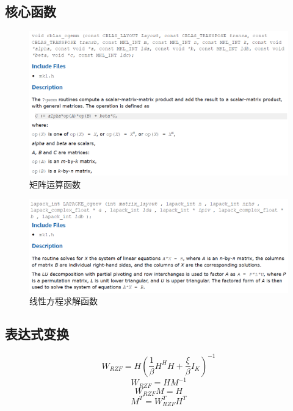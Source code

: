 \documentclass{article}
\begin{document}
\subsection{核心函数}
\begin{figure}[H]
	\centering
	\includegraphics[width = \textwidth]{gemm.png}
	\caption{矩阵运算函数}
\end{figure}
\begin{figure}[H]
	\centering
	\includegraphics[width = \textwidth]{gesv.png}
	\caption{线性方程求解函数}
\end{figure}
\subsection{表达式变换}
\begin{equation}
	W_{RZF}=H(\frac{1}{\beta} H^H H+\frac{\xi}{\beta} I_K)^{-1}
\end{equation}
\begin{equation}
W_{RZF}=HM^{-1}
\end{equation}
\begin{equation}
W_{RZF}M=H
\end{equation}
\begin{equation}
M^T=W_{RZF}^TH^T
\end{equation}
\end{document}
